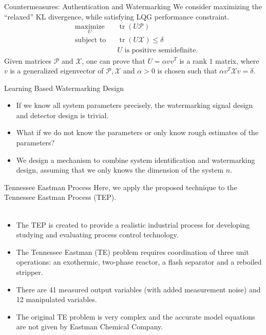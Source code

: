 \documentclass[10pt]{beamer}
\DeclareMathOperator{\tr}{tr}
\begin{document}
  \begin{frame}{Countermeasures: Authentication and Watermarking}
    We consider maximizing the ``relaxed'' KL divergence, while satisfying LQG performance constraint.
    \begin{align*}
      &\mathop{\textrm{maximize}}\limits_{U}&
      & \tr (U\mathcal P)\\
      &\textrm{subject to}&
      & \tr (U\mathcal X) \leq \delta \\
      &&& U \text{ is positive semidefinite.}
    \end{align*}
    Given matrices $\mathcal P$ and $\mathcal X$, one can prove that $U = \alpha v v^T$ is a rank $1$ matrix, where $v$ is a generalized eigenvector of $\mathcal P,\mathcal X$ and $\alpha >0$ is chosen such that $ \alpha v^T\mathcal X v =\delta$.
  \end{frame}

  \begin{frame}{Learning Based Watermarking Design}
    \begin{itemize}
    \item If we know all system parameters precisely, the watermarking signal design and detector design is trivial.
    \item What if we do not know the parameters or only know rough estimates of the parameters?
    \item We design a mechanism to combine system identification and watermarking design, assuming that we only knows the dimension of the system $n$.
    \end{itemize}
  \end{frame}

  \begin{frame}{Tennessee Eastman Process}
    Here, we apply the proposed technique to the Tennessee Eastman Process (TEP).\\~\\
    \begin{itemize}
    \item The TEP is created to provide a realistic industrial process for developing studying and evaluating process control technology. 
    \item The Tennessee Eastman (TE) problem requires coordination of three unit operations: an exothermic, two-phase reactor, a flash separator and a reboiled  stripper.
    \item There are 41 measured output variables (with added measurement noise) and 12 manipulated variables.
    \item The original TE problem is very complex and the accurate model equations are not given by Eastman Chemical Company.   
    \end{itemize}
  \end{frame}
\end{document}
